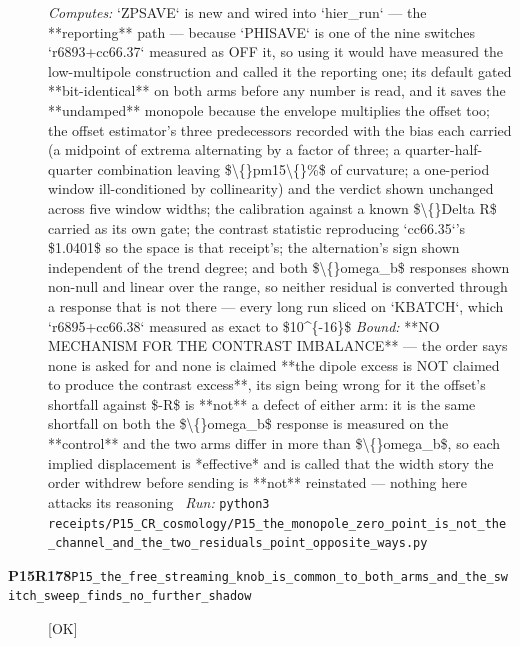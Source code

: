 \begin{description}
\emph{Computes:} `ZPSAVE` is new and wired into `hier\_run` --- the **reporting** path --- because `PHISAVE` is one of the nine switches `r6893+cc66.37` measured as OFF it, so using it would have measured the low-multipole construction and called it the reporting one; its default gated **bit-identical** on both arms before any number is read, and it saves the **undamped** monopole because the envelope multiplies the offset too; the offset estimator's three predecessors recorded with the bias each carried (a midpoint of extrema alternating by a factor of three; a quarter-half-quarter combination leaving \$\textbackslash\{\}pm15\textbackslash\{\}\%\$ of curvature; a one-period window ill-conditioned by collinearity) and the verdict shown unchanged across five window widths; the calibration against a known \$\textbackslash\{\}Delta R\$ carried as its own gate; the contrast statistic reproducing `cc66.35`'s \$1.0401\$ so the space is that receipt's; the alternation's sign shown independent of the trend degree; and both \$\textbackslash\{\}omega\_b\$ responses shown non-null and linear over the range, so neither residual is converted through a response that is not there --- every long run sliced on `KBATCH`, which `r6895+cc66.38` measured as exact to \$10\textasciicircum{}\{-16\}\$
 \emph{Bound:}  **NO MECHANISM FOR THE CONTRAST IMBALANCE** --- the order says none is asked for and none is claimed  **the dipole excess is NOT claimed to produce the contrast excess**, its sign being wrong for it  the offset's shortfall against \$-R\$ is **not** a defect of either arm: it is the same shortfall on both  the \$\textbackslash\{\}omega\_b\$ response is measured on the **control** and the two arms differ in more than \$\textbackslash\{\}omega\_b\$, so each implied displacement is *effective* and is called that  the width story the order withdrew before sending is **not** reinstated --- nothing here attacks its reasoning
\ \emph{Run:} \texttt{python3 receipts/P15\_CR\_cosmology/P15\_the\_monopole\_zero\_point\_is\_not\_the\_channel\_and\_the\_two\_residuals\_point\_opposite\_ways.py}
\item[\rcptlabel{P15_the_free_streaming_knob_is_common_to_both_arms_and_the_switch_sweep_finds_no_further_shadow}{P15R178}\textbf{P15R178}\quad\texttt{P15\_the\_free\_streaming\_knob\_is\_common\_to\_both\_arms\_and\_the\_switch\_sweep\_finds\_no\_further\_shadow}]\hfill\textsf{[OK]}\\

\end{description}
